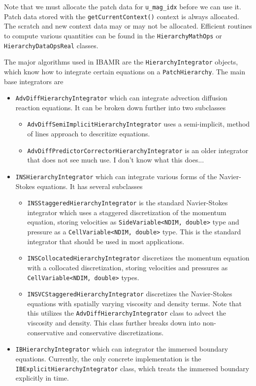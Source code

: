 \documentclass{article}
\begin{document}
Note that we must allocate the patch data for \verb|u_mag_idx| before we can use it. Patch data stored with the \verb|getCurrentContext()| context is always allocated. The scratch and new context data may or may not be allocated. Efficient routines to compute various quantities can be found in the \verb|HierarchyMathOps| or \verb|HierarchyDataOpsReal| classes.

The major algorithms used in IBAMR are the \verb|HierarchyIntegrator| objects, which know how to integrate certain equations on a \verb|PatchHierarchy|. The main base integrators are
\begin{itemize}
\item \verb|AdvDiffHierarchyIntegrator| which can integrate advection diffusion reaction equations. It can be broken down further into two subclasses
\begin{itemize}
  \item \verb|AdvDiffSemiImplicitHierarchyIntegrator| uses a semi-implicit, method of lines approach to descritize equations.
  \item \verb|AdvDiffPredictorCorrectorHierarchyIntegrator| is an older integrator that does not see much use. I don't know what this does...
\end{itemize}
\item \verb|INSHierarchyIntegrator| which can integrate various forms of the Navier-Stokes equations. It has several subclasses
  \begin{itemize}
    \item \verb|INSStaggeredHierarchyIntegrator| is the standard Navier-Stokes integrator which uses a staggered discretization of the momentum equation, storing velocities as \verb|SideVariable<NDIM, double>| type and pressure as a \verb|CellVariable<NDIM, double>| type. This is the standard integrator that should be used in most applications.
    \item \verb|INSCollocatedHierarchyIntegrator| discretizes the momentum equation with a collocated discretization, storing velocities and pressures as \verb|CellVariable<NDIM, double>| types.
    \item \verb|INSVCStaggeredHierarchyIntegrator| discretizes the Navier-Stokes equations with spatially varying viscosity and density terms. Note that this utilizes the \verb|AdvDiffHierarchyIntegrator| class to advect the viscosity and density. This class further breaks down into non-conservative and conservative discretizations.
  \end{itemize}
\item \verb|IBHierarchyIntegrator| which can integrator the immersed boundary equations. Currently, the only concrete implementation is the \verb|IBExplicitHierarchyIntegrator| class, which treats the immersed boundary explicitly in time.
\end{itemize}
\end{document}
